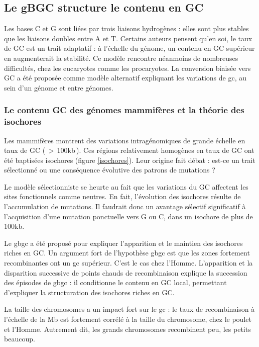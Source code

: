 \documentclass[11pt, oneside]{scrartcl}
\begin{document}
\subsection{Le gBGC structure le contenu en GC}
\label{sec:orgheadline14}
Les bases C et G sont liées par trois liaisons hydrogènes : elles sont plus
stables que les liaisons doubles entre A et T. Certains auteurs pensent qu'en
soi, le taux de GC est un trait adaptatif : à l'échelle du génome, un contenu en
GC supérieur en augmenterait la stabilité. Ce modèle rencontre néanmoins de
nombreuses difficultés, chez les eucaryotes comme les procaryotes. La conversion
biaisée vers GC a été proposée comme modèle alternatif expliquant les variations
de \ac{gc}, au sein d'un génome et entre génomes.

\subsubsection{Le contenu GC des génomes mammifères et la théorie des isochores}
\label{sec:orgheadline12}
Les mammifères montrent des variations intragénomiques de grande échelle en taux
de GC\cite{eyre-walker_evolution_2001} ( \(>\) 100kb ). Ces régions relativement
homogènes en taux de GC ont été baptisées isochores (figure \ref{isochores}).
Leur origine fait débat : est-ce un trait sélectionné ou une conséquence
évolutive des patrons de mutations ?

Le modèle sélectionniste se heurte au fait que les variations du GC affectent
les sites fonctionnels comme neutres. En fait, l'évolution des isochores résulte
de l'accumulation de mutations. Il faudrait donc un avantage sélectif
significatif à l'acquisition d'une mutation ponctuelle vers G ou C, dans un
isochore de plus de 100kb.

Le \ac{gbgc} a été proposé pour expliquer l'apparition et le maintien des isochores
riches en GC\cite{duret_new_2006}. Un argument fort de l'hypothèse \ac{gbgc} est que
les zones fortement recombinantes ont un \ac{gc} supérieur. C'est le cas chez
l'Homme\cite{duret_impact_2008, berglund_hotspots_2009}. L'apparition et la
disparition successive de points chauds de recombinaison explique la succession
des épisodes de \ac{gbgc} : il conditionne le contenu en GC local, permettant
d'expliquer la structuration des isochores riches en GC. 

La taille des chromosomes a un impact fort sur le \ac{gc} : le taux de
recombinaison à l'échelle de la Mb est fortement corrélé à la taille du
chromosome, chez le poulet et l'Homme\cite{kaback_chromosome_1999}. Autrement
dit, les grands chromosomes recombinent peu, les petits beaucoup.
\end{document}
